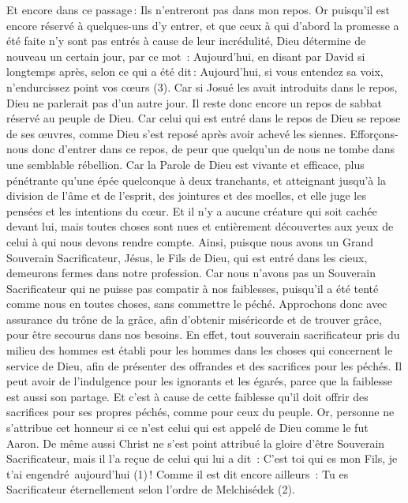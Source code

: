 \begin{multicols}{2}
Et encore dans ce passage : Ils n’entreront pas dans mon repos.
Or puisqu’il est encore réservé à quelques-uns d’y entrer, et que ceux à qui d’abord la promesse a été faite n’y sont pas entrés à cause de leur incrédulité,
Dieu détermine de nouveau un certain jour, par ce mot : Aujourd'hui, en disant par David si longtemps après, selon ce qui a été dit : Aujourd'hui, si vous entendez sa voix, n'endurcissez point vos cœurs (3).
Car si Josué les avait introduits dans le repos, Dieu ne parlerait pas d'un autre jour.
Il reste donc encore un repos de sabbat réservé au peuple de Dieu.
Car celui qui est entré dans le repos de Dieu se repose de ses œuvres, comme Dieu s’est reposé après avoir achevé les siennes.
Efforçons-nous donc d'entrer dans ce repos, de peur que quelqu'un de nous ne tombe dans une semblable rébellion.
Car la Parole de Dieu est vivante et efficace, plus pénétrante qu’une épée quelconque à deux tranchants, et atteignant jusqu’à la division de l'âme et de l'esprit, des jointures et des moelles, et elle juge les pensées et les intentions du cœur.
Et il n'y a aucune créature qui soit cachée devant lui, mais toutes choses sont nues et entièrement découvertes aux yeux de celui à qui nous devons rendre compte.
Ainsi, puisque nous avons un Grand Souverain Sacrificateur, Jésus, le Fils de Dieu, qui est entré dans les cieux, demeurons fermes dans notre profession.
Car nous n'avons pas un Souverain Sacrificateur qui ne puisse pas compatir à nos faiblesses, puisqu’il a été tenté comme nous en toutes choses, sans commettre le péché.
Approchons donc avec assurance du trône de la grâce, afin d’obtenir miséricorde et de trouver grâce, pour être secourus dans nos besoins.
\VerseOne{}En effet, tout souverain sacrificateur pris du milieu des hommes est établi pour les hommes dans les choses qui concernent le service de Dieu, afin de présenter des offrandes et des sacrifices pour les péchés.
Il peut avoir de l’indulgence pour les ignorants et les égarés, parce que la faiblesse est aussi son partage.
Et c’est à cause de cette faiblesse qu’il doit offrir des sacrifices pour ses propres péchés, comme pour ceux du peuple.
Or, personne ne s'attribue cet honneur si ce n’est celui qui est appelé de Dieu comme le fut Aaron.
De même aussi Christ ne s'est point attribué la gloire d’être Souverain Sacrificateur, mais il l’a reçue de celui qui lui a dit : C’est toi qui es mon Fils, je t'ai engendré aujourd'hui (1) !
Comme il est dit encore ailleurs : Tu es Sacrificateur éternellement selon l'ordre de Melchisédek (2).

\end{multicols}
